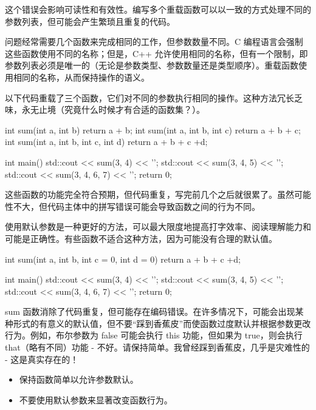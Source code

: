 这个错误会影响可读性和有效性。编写多个重载函数可以以一致的方式处理不同的参数列表，但可能会产生繁琐且重复的代码。


问题经常需要几个函数来完成相同的工作，但参数数量不同。C 编程语言会强制这些函数使用不同的名称；但是，C++ 允许使用相同的名称，但有一个限制，即参数列表必须是唯一的（无论是参数类型、参数数量还是类型顺序）。重载函数使用相同的名称，从而保持操作的语义。

以下代码重载了三个函数，它们对不同的参数执行相同的操作。这种方法冗长乏味，永无止境（究竟什么时候才有合适的函数集？）。


\begin{cpp}
int sum(int a, int b) { return a + b; }
int sum(int a, int b, int c) { return a + b + c; }
int sum(int a, int b, int c, int d) { return a + b + c +d; }

int main() {
  std::cout << sum(3, 4) << '\n';
  std::cout << sum(3, 4, 5) << '\n';
  std::cout << sum(3, 4, 6, 7) << '\n';
  return 0;
}
\end{cpp}


这些函数的功能完全符合预期，但代码重复，写完前几个之后就很累了。虽然可能性不大，但代码主体中的拼写错误可能会导致函数之间的行为不同。


使用默认参数是一种更好的方法，可以最大限度地提高打字效率、阅读理解能力和可能是正确性。有些函数不适合这种方法，因为可能没有合理的默认值。


\begin{cpp}
int sum(int a, int b, int c = 0, int d = 0) { return a + b + c +d; }

int main() {
  std::cout << sum(3, 4) << '\n';
  std::cout << sum(3, 4, 5) << '\n';
  std::cout << sum(3, 4, 6, 7) << '\n';
  return 0;
}
\end{cpp}

sum 函数消除了代码重复，但可能存在编码错误。在许多情况下，可能会出现某种形式的有意义的默认值，但不要“踩到香蕉皮”而使函数过度默认并根据参数更改行为。例如，布尔参数为 false 可能会执行 this 功能，但如果为 true，则会执行 that（略有不同）功能 - 不好。请保持简单。我曾经踩到香蕉皮，几乎是灾难性的 - 这是真实存在的！


\begin{itemize}
\item
保持函数简单以允许参数默认。

\item
不要使用默认参数来显著改变函数行为。
\end{itemize}






